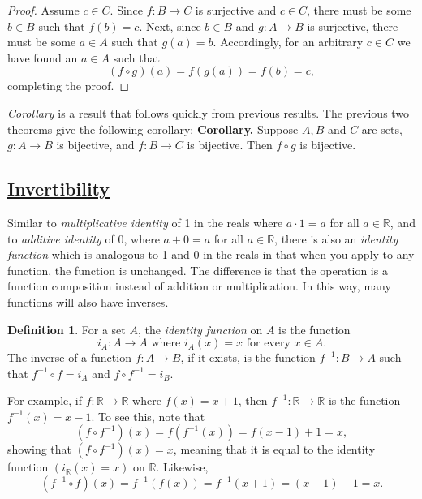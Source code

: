 \documentclass{amsart}
\theoremstyle{definition}
\newtheorem*{dfn}{Definition}
\theoremstyle{definition}
\theoremstyle{remark}
\begin{document}
\begin{proof}
      Assume $c \in C$. Since $f:B\rightarrow C$ is surjective and $c\in C$, there must be some $b\in B$ such that $f(b)=c$. Next, since $b\in B$ and $g:A\rightarrow B$ is surjective, there must be some $a\in A$ such that $g(a)=b$.
      Accordingly, for an arbitrary $c\in C$ we have found an $a\in A$ such that
      \[(f\circ g)(a) = f(g(a)) = f(b) = c, \]
      completing the proof.
\end{proof}
\bigskip
\emph{Corollary} is a result that follows quickly from previous results. The previous two theorems give the following corollary:
\bigskip
\noindent \textbf{Corollary.} Suppose $A,B$ and $C$ are sets, $g:A\rightarrow B$ is bijective, and $f:B\rightarrow C$ is bijective. Then $f\circ g$ is bijective.










\bigskip \bigskip \bigskip

\subsection{\underline{Invertibility}}\hspace*{\fill}
\bigskip

Similar to \emph{multiplicative identity} of 1 in the reals where $a\cdot 1=a$ for all $a\in\mathbb{R}$, and to \emph{additive identity} of 0, where $a+0=a$ for all $a\in\mathbb{R}$, there is also an \emph{identity function} which is analogous to 1 and 0 in the reals in that when you apply to any function, the function is unchanged. The difference is that the operation is a function composition instead of addition or multiplication. In this way, many functions will also have inverses.

\begin{dfn}
      For a set $A$, the \emph{identity function} on $A$ is the function
      \[i_A:A\rightarrow A \text{ where } i_A(x)=x \text{ for every } x\in A.\]
      The inverse of a function $f:A\rightarrow B$, if it exists, is the function $f^{-1}:B\rightarrow A$ such that $f^{-1}\circ f=i_A$ and $f\circ f^{-1}=i_B$.
\end{dfn}


For example, if $f:\mathbb{R}\rightarrow\mathbb{R}$ where $f(x)=x+1$, then $f^{-1}:\mathbb{R}\rightarrow\mathbb{R}$ is the function $f^{-1}(x)=x-1$. To see this, note that
\[(f\circ f^{-1})(x) = f(f^{-1}(x)) = f(x-1)+1 = x, \]
showing that $(f\circ f^{-1})(x)=x$, meaning that it is equal to the identity function $(i_\mathbb{R}(x)=x)$ on $\mathbb{R}$. Likewise,
\[(f^{-1}\circ f)(x) = f^{-1}(f(x)) = f^{-1}(x+1) = (x+1)-1 = x. \]
\end{document}
